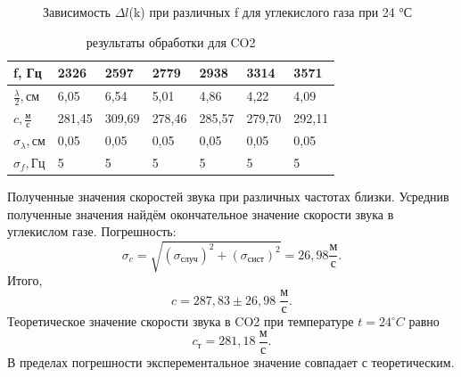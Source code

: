\documentclass[a4paper,11pt]{extarticle} %
\begin{document}
			
	\begin{figure}[ht!]
    \caption{Зависимость $\Delta l$(k) при различных f для углекислого газа при 24 °С}
	\end{figure}
		
		\begin{table}[ht!]
		\begin{center}
		\begin{tabular}{|l|l|l|l|l|l|l|}
			\hline
			f, Гц & 2326 & 2597 & 2779 & 2938 & 3314 & 3571
			\\
			
			\hline
			$\frac{\lambda}{2},{\text{см}}$ & 6,05 & 6,54 & 5,01 & 4,86 & 4,22 & 4,09
			\\
			\hline
			$c,\frac{\text{м}}{\text{с}}$ & 281,45 & 309,69 & 278,46 & 285,57 & 279,70 & 292,11
			\\
			\hline
			$\sigma_{\lambda}, {\text{см}} $ & 0,05 & 0,05 & 0,05 & 0,05 & 0,05 & 0,05
			\\
			\hline
			$\sigma_{f},{\text{Гц}}$ & 5 & 5 & 5 & 5 & 5 & 5
			\\
			\hline
		\end{tabular}
		\caption{результаты обработки для CO2}
		\end{center}
		\end{table}
		\newpage
		Полученные значения скоростей звука при различных частотах близки.
		Усреднив полученные значения найдём окончательное значение скорости звука в углекислом газе. Погрешность: $$\sigma_{c} = \sqrt{(\sigma_{\text{случ}})^2+(\sigma_{\text{сист}})^2} = 26,98\frac{\text{м}}{\text{с}}.$$
		Итого, $$c = 287,83 \pm 26,98 \; \frac{\text{м}}{\text{с}}.$$
		Теоретическое значение скорости звука в CO2 при температуре $t = 24 ^\circ C$ равно $$c_{\text{т}} = 281,18 \: \frac{\text{м}}{\text{с}}.$$
		В пределах погрешности эксперементальное значение совпадает с теоретическим.
		
\end{document}
